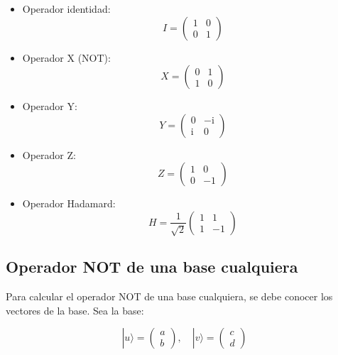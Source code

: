 \documentclass[11pt]{article}
\newcommand{\ii}{\mathrm{i}}
\begin{document}
\begin{itemize}
    \item Operador identidad:
    \begin{equation}
        I = \begin{pmatrix} 1 & 0 \\ 0 & 1 \end{pmatrix}
    \end{equation}
    
    \item Operador X (NOT):
    \begin{equation}
        X = \begin{pmatrix} 0 & 1 \\ 1 & 0 \end{pmatrix}
    \end{equation}
    
    \item Operador Y:
    \begin{equation}
        Y = \begin{pmatrix} 0 & -\ii \\ \ii & 0 \end{pmatrix}
    \end{equation}
    
    \item Operador Z:
    \begin{equation}
        Z = \begin{pmatrix} 1 & 0 \\ 0 & -1 \end{pmatrix}
    \end{equation}
    
    \item Operador Hadamard:
    \begin{equation}
        H = \frac{1}{\sqrt{2}} \begin{pmatrix} 1 & 1 \\ 1 & -1 \end{pmatrix}
    \end{equation}
\end{itemize}

\subsection{Operador NOT de una base cualquiera}

Para calcular el operador NOT de una base cualquiera, se debe conocer los vectores de la base. Sea la base:

\begin{equation}
    |u\rangle = \begin{pmatrix} a \\ b \end{pmatrix}, \quad |v\rangle = \begin{pmatrix} c \\ d \end{pmatrix}
\end{equation}
\end{document}
